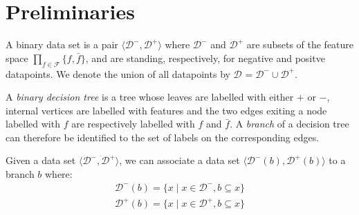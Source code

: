 \documentclass{llncs}
\def\posclass{+}
\def\negclass{-}
\def\datasymb{D}
\newcommand{\setex}[1]{\ensuremath{{\mathcal \datasymb}^{#1}}\xspace}
\newcommand{\posex}{{\setex{\posclass}}\xspace}
\newcommand{\negex}{{\setex{\negclass}}\xspace}
\newcommand{\allex}{{\setex{}}\xspace}
\newcommand{\features}{\ensuremath{{\mathcal F}}\xspace}
\newcommand{\var}{\ensuremath{x}}
\newcommand{\ex}{\ensuremath{\var}}
\newcommand{\afeat}[0]{\ensuremath{f}}
\newcommand{\aclass}[0]{\ensuremath{l}}
\newcommand{\classlabel}[1][]{\ensuremath{\ifthenelse{\equal{#1}{}}{{y}}{{y({{#1}})}}}}
\newcommand{\abranch}[0]{\ensuremath{b}}
\begin{document}

\section{Preliminaries}

A binary data set is a pair $\langle \negex,\posex \rangle$ where $\negex$ and $\posex$ are subsets of the feature space $\prod_{\afeat \in \features}\{\afeat,\bar{\afeat}\}$, and are standing, respectively, for negative and positve datapoints.
We denote the union of all datapoints by $\allex = \negex \cup \posex$.


A \emph{binary decision tree} is a tree whose leaves are labelled with either $\posclass$ or $\negclass$, internal vertices are labelled with features and the two edges exiting a node labelled with $\afeat$ are respectively labelled with $\afeat$ and $\bar{\afeat}$.
A \emph{branch} of a decision tree can therefore be identified to the set of labels on the corresponding edges.

 
Given a data set $\langle \negex,\posex \rangle$, we can associate a data set $\langle \negex(\abranch),\posex(\abranch) \rangle$ to a branch $\abranch$ where:
\begin{eqnarray*}
\negex(\abranch) = \{\ex \mid \ex \in \negex, \abranch \subseteq \ex\}\\
\posex(\abranch) = \{\ex \mid \ex \in \posex, \abranch \subseteq \ex\}
\end{eqnarray*}
\end{document}
